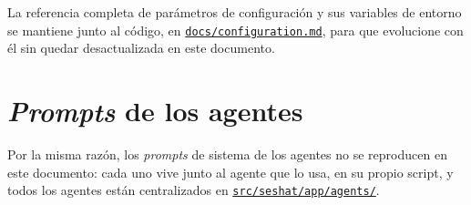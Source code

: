 La referencia completa de parámetros de configuración y sus variables de entorno se mantiene junto
al código, en \href{https://github.com/josepmafe/seshat/blob/main/docs/configuration.md}{\texttt{docs/configuration.md}},
para que evolucione con él sin quedar desactualizada en este documento.

\section{\textit{Prompts} de los agentes}

Por la misma razón, los \textit{prompts} de sistema de los agentes no se reproducen en este
documento: cada uno vive junto al agente que lo usa, en su propio script, y todos los agentes están
centralizados en
\href{https://github.com/josepmafe/seshat/tree/main/src/seshat/app/agents}{\texttt{src/seshat/app/agents/}}.
